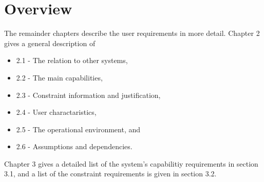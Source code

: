 \section{Overview}

The remainder chapters describe the user requirements in more detail. Chapter 2 gives a general description of 
\begin{itemize}
\item 2.1 - The relation to other systems,
\item 2.2 - The main capabilities,
\item 2.3 - Constraint information and justification,
\item 2.4 - User charactaristics,
\item 2.5 - The operational environment, and
\item 2.6 - Assumptions and dependencies.
\end{itemize}

Chapter 3 gives a detailed list of the system's capabilitiy requirements in section 3.1, and a list of the constraint requirements is given in section 3.2.


